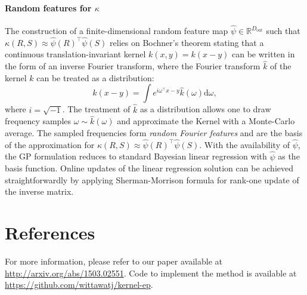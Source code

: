 \documentclass[a4paper,10pt]{article}
\begin{document}
\paragraph{Random features for $\kappa$}
The construction of 
a finite-dimensional random feature map $\hat{\psi} \in \mathbb{R}^{D_\mathrm{out}}$ such that 
$\kappa(R, S) \approx \hat{\psi}(R)^\top \hat{\psi}(S)$ relies on Bochner's
theorem stating that a continuous translation-invariant kernel $k(x, y) = k(x-y)$ 
can be written in the form of an inverse Fourier transform, where the Fourier 
transform $\hat{k}$ of the kernel $k$ can be treated as a distribution:
%
\begin{equation}
    k(x-y) = \int e^{i\omega^\top x-y} \hat{k}(\omega) \mathrm{d}\omega ,
\end{equation}
where $i=\sqrt{-1}$. The treatment of $\hat{k}$ as a distribution allows one 
to draw frequency samples $\omega \sim \hat{k}(\omega)$ and approximate the Kernel 
with a Monte-Carlo average. The sampled frequencies form \emph{random Fourier features}
and are the basis of the approximation for  $\kappa(R, S) \approx \hat{\psi}(R)^\top \hat{\psi}(S)$.
With the availability of $\hat{\psi}$, the GP formulation reduces to standard Bayesian 
linear regression with $\hat{\psi}$ as the basis function. Online updates of the 
linear regression solution can be achieved straightforwardly by applying
Sherman-Morrison formula for rank-one update of the inverse matrix.


\section*{References}
For more information, please refer to our paper available at
\url{http://arxiv.org/abs/1503.02551}. Code to implement the method is available 
at \url{https://github.com/wittawatj/kernel-ep}.
\end{document}
